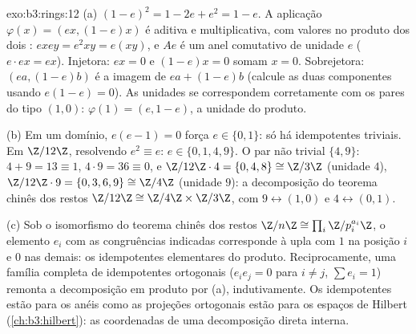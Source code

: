 \begin{solution}{exo:b3:rings:12}
(a) $(1-e)^2 = 1 - 2e + e^2 = 1 - e$. A aplicação $\varphi(x) =
(ex, (1-e)x)$ é aditiva e multiplicativa, com valores no
produto dos dois : $exey = e^2xy = e(xy)$, e $Ae$ é um anel comutativo de
unidade $e$ ($e\cdot ex = ex$). Injetora: $ex = 0$ e $(1-e)x = 0$ somam $x = 0$.
Sobrejetora: $(ea,
(1-e)b)$ é a imagem de $ea + (1-e)b$ (calcule as duas componentes
usando $e(1-e) = 0$). As unidades se correspondem corretamente com os pares do
tipo $(1, 0)$: $\varphi(1) = (e, 1-e)$, a unidade do produto.

(b) Em um domínio, $e(e - 1) = 0$ força $e \in \{0, 1\}$: só há idempotentes triviais. Em
$\Z/12\Z$, resolvendo $e^2 \equiv e$: $e
\in \{0, 1, 4, 9\}$. O par não trivial $\{4, 9\}$: $4 + 9 =
13 \equiv 1$, $4\cdot9 = 36 \equiv 0$, e
$\Z/12\Z\cdot4 =
\{0, 4, 8\} \cong \Z/3\Z$ (unidade $4$), $\Z/12\Z\cdot9 = \{0,
3, 6, 9\} \cong \Z/4\Z$ (unidade $9$): a decomposição do
teorema chinês dos restos $\Z/12\Z \cong \Z/4\Z\times\Z/3\Z$, com $9 \leftrightarrow
(1, 0)$ e $4 \leftrightarrow (0, 1)$.

(c) Sob o isomorfismo do teorema chinês dos restos $\Z/n\Z \cong \prod_i
\Z/p_i^{a_i}\Z$, o elemento
$e_i$ com as congruências indicadas corresponde à upla com $1$
na posição $i$ e $0$ nas demais: os idempotentes elementares do
produto. Reciprocamente, uma família completa de idempotentes
ortogonais ($e_ie_j = 0$ para $i \neq j$, $\sum e_i = 1$) remonta a decomposição em produto
por (a), indutivamente. Os idempotentes estão para os anéis como as
projeções ortogonais estão para os espaços de Hilbert
(\cref{ch:b3:hilbert}): as coordenadas de uma decomposição direta interna.
\end{solution}

